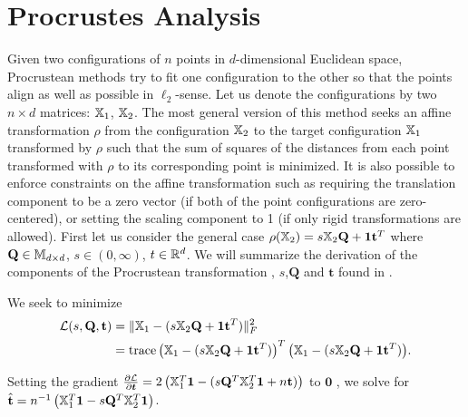 \documentclass[12pt,oneside,final]{thesis}
\begin{document}
\section{Procrustes Analysis}
Given two configurations of $n$ points in $d$-dimensional Euclidean space, Procrustean methods try to fit one configuration to the other so that the points align as well as possible in $\ell_2$-sense. Let us denote the configurations by two $n \times d$ matrices: ${\mathbb{X}}_1$, ${\mathbb{X}}_2$. The most general version of this  method  seeks an affine transformation $\rho$ from the configuration ${\mathbb{X}}_2$  to the target configuration ${\mathbb{X}}_1$  transformed by $\rho$ such that the sum of squares of the distances from each point transformed with $\rho$ to its corresponding point is minimized.
It is also possible to  enforce constraints on the affine transformation such as requiring the translation component to be a zero vector (if both of the point configurations are zero-centered), or setting the scaling component to 1 (if only rigid transformations are allowed). First let us consider the general case  $\rho({{\mathbb{X}}_2}) = s{\mathbb{X}}_2\mathbf{Q}+\mbox{{\bf 1}}\mathbf{t}^T$ where $\mathbf{Q} \in \mathbb{M}_{d\times d}$, $s \in (0,\infty)$, $t\in \mathbb{R}^{d}$. We will summarize the derivation of the components of the Procrustean transformation , $s$,$\mathbf{Q}$ and $\mathbf{t}$ found in \cite{borg+groenen:1997}.

We seek to  minimize 
\begin{align*}
\mathcal{L}(s,\mathbf{Q},\mathbf{t}) &= \|{\mathbb{X}}_1 - (s{\mathbb{X}}_2\mathbf{Q}+\mbox{{\bf 1}} \mathbf{t}^T)\|_F^2  
\\ &= \operatorname{trace} {\left({\mathbb{X}}_1 - (s{\mathbb{X}}_2\mathbf{Q}+\mbox{{\bf 1}} \mathbf{t}^T) \right)^T \left({\mathbb{X}}_1 - (s{\mathbb{X}}_2\mathbf{Q}+\mbox{{\bf 1}} \mathbf{t}^T) \right)}.
\end{align*}

Setting the gradient $\frac{\partial \mathcal{L}}{\partial \bm{t}}=2 \left({\mathbb{X}}_1^T \mbox{{\bf 1}} - (s\mathbf{Q}^T {\mathbb{X}}_2^T \mbox{{\bf 1}}+ n\mathbf{t})\right)$ to $\mathbf{0}$ ,
we solve for $\hat{\mathbf{t}}= n^{-1} \left({\mathbb{X}}_1^T \mbox{{\bf 1}}  -s\mathbf{Q}^T {\mathbb{X}}_2^T \mbox{{\bf 1}} \right)$. 
\end{document}
